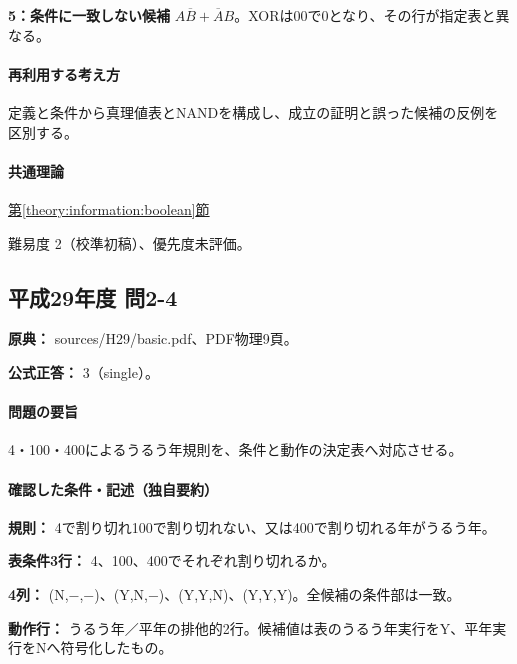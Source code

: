 \noindent\textbf{5：条件に一致しない候補} \(A\overline B+\overline A B\)。XORは00で0となり、その行が指定表と異なる。\par

\paragraph{再利用する考え方} 定義と条件から真理値表とNANDを構成し、成立の証明と誤った候補の反例を区別する。

\paragraph{共通理論} \hyperref[theory:information:boolean]{第\ref*{theory:information:boolean}節}

\par 難易度 2（校準初稿）、優先度未評価。

\subsection{平成29年度 問2-4}
\label{q:h29-reg-basic-2-4}

\noindent\textbf{原典：} sources/H29/basic.pdf、PDF物理9頁。

\textbf{公式正答：} 3（single）。

\paragraph{問題の要旨} 4・100・400によるうるう年規則を、条件と動作の決定表へ対応させる。

\paragraph{確認した条件・記述（独自要約）}\mbox{}\par

\noindent\textbf{規則：} 4で割り切れ100で割り切れない、又は400で割り切れる年がうるう年。\par

\noindent\textbf{表条件3行：} 4、100、400でそれぞれ割り切れるか。\par

\noindent\textbf{4列：} (N,−,−)、(Y,N,−)、(Y,Y,N)、(Y,Y,Y)。全候補の条件部は一致。\par

\noindent\textbf{動作行：} うるう年／平年の排他的2行。候補値は表のうるう年実行をY、平年実行をNへ符号化したもの。\par


